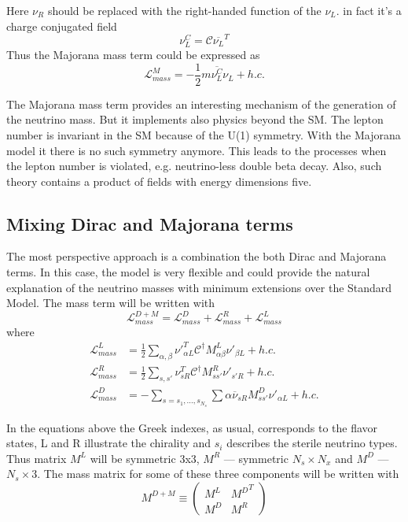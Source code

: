 \documentclass[../main.tex]{subfiles}
\begin{document}
Here $\nu_R$ should be replaced with the right-handed function of the $\nu_L$. in fact it's a charge conjugated field
\begin{equation}
\nu_L^C=\mathcal{C}\overline{\nu_L}^T
\end{equation}
Thus the Majorana mass term could be expressed as
\begin{equation}
\mathcal{L}^M_{mass}=-\frac{1}{2}m\overline{\nu_L^C}\nu_L+h.c.
\end{equation}

The Majorana mass term provides an interesting mechanism of the generation of the neutrino mass. But it implements also physics beyond the SM. The lepton number is invariant in the SM because of the U(1) symmetry. With the Majorana model it there is no such symmetry anymore. This leads to the processes when the lepton number is violated, e.g. neutrino-less double beta decay. Also, such theory contains a product of fields with energy dimensions five.


\subsection{Mixing Dirac and Majorana terms}
The most perspective approach is a combination the both Dirac and Majorana terms. In this case, the model is very flexible and could provide the natural explanation of the neutrino masses with minimum extensions over the Standard Model. The mass term will be written with
\begin{equation}
\label{eq:intro:comb}
\mathcal{L}_{mass}^{D+M}=\mathcal{L}^D_{mass}+\mathcal{L}^R_{mass}+\mathcal{L}^L_{mass}
\end{equation}
where
\begin{align}
\mathcal{L}^L_{mass}&=\frac{1}{2}\sum_{\alpha,\beta}\nu'^T_{\alpha L}\mathcal{C}^\dagger M^L_{\alpha\beta}\nu'_{\beta L}+h.c. \\
\mathcal{L}^R_{mass}&=\frac{1}{2}\sum_{s, s'}\nu^T_{s R}\mathcal{C}^\dagger M^R_{ss'}\nu'_{s' R}+h.c. \\
\mathcal{L}^D_{mass}&=-\sum_{s=s_1, ..., s_{N_s}}\sum{\alpha}\overline{\nu}_{sR}M^D_{ss'}\nu'_{\alpha L} +h.c.
\end{align}

In the equations above the Greek indexes, as usual, corresponds to the flavor states, L and R illustrate the chirality and $s_i$ describes the sterile neutrino types. Thus matrix $M^L$ will be symmetric 3x3, $M^R$ --- symmetric $N_s\times N_x$ and $M^D$ --- $N_s\times3$. The mass matrix for some of these three components will be written with
\begin{equation}
M^{D+M}\equiv
\begin{pmatrix}
M^L & {M^D}^T \\
M^D & M^R
\end{pmatrix}
\end{equation}
\end{document}
